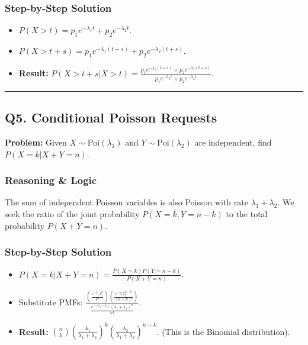 \documentclass[11pt]{article}
\begin{document}
\subsubsection*{Step-by-Step Solution}
\begin{itemize}
    \item $P(X > t) = p_1e^{-\lambda_1 t} + p_2e^{-\lambda_2 t}$.
    \item $P(X > t+s) = p_1e^{-\lambda_1(t+s)} + p_2e^{-\lambda_2(t+s)}$.
    \item \textbf{Result:} $P(X > t+s | X > t) = \frac{p_1e^{-\lambda_1(t+s)} + p_2e^{-\lambda_2(t+s)}}{p_1e^{-\lambda_1 t} + p_2e^{-\lambda_2 t}}$.
\end{itemize}

\vspace{0.5cm}
\hrule
\vspace{0.5cm}

\subsection*{Q5. Conditional Poisson Requests}

\textbf{Problem:} Given $X \sim \text{Poi}(\lambda_1)$ and $Y \sim \text{Poi}(\lambda_2)$ are independent, find $P(X=k | X+Y=n)$.

\subsubsection*{Reasoning \& Logic}
The sum of independent Poisson variables is also Poisson with rate $\lambda_1 + \lambda_2$. We seek the ratio of the joint probability $P(X=k, Y=n-k)$ to the total probability $P(X+Y=n)$.

\subsubsection*{Step-by-Step Solution}
\begin{itemize}
    \item $P(X=k|X+Y=n) = \frac{P(X=k)P(Y=n-k)}{P(X+Y=n)}$.
    \item Substitute PMFs: $\frac{\left(\frac{e^{-\lambda_1}\lambda_1^k}{k!}\right)\left(\frac{e^{-\lambda_2}\lambda_2^{n-k}}{(n-k)!}\right)}{\frac{e^{-(\lambda_1+\lambda_2)}(\lambda_1+\lambda_2)^n}{n!}}$.
    \item \textbf{Result:} $\binom{n}{k}\left(\frac{\lambda_1}{\lambda_1+\lambda_2}\right)^k\left(\frac{\lambda_2}{\lambda_1+\lambda_2}\right)^{n-k}$. (This is the Binomial distribution).
\end{itemize}
\end{document}
